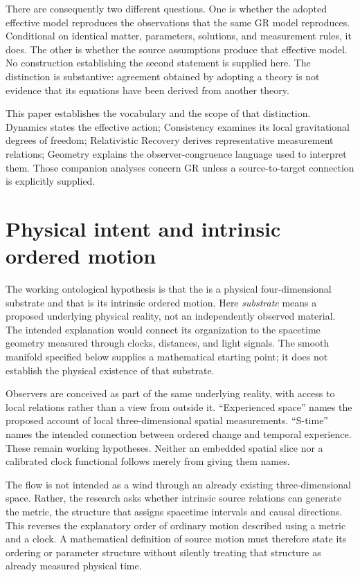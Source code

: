 \documentclass[11pt]{article}
\begin{document}
There are consequently two different questions. One is whether the adopted effective model reproduces the observations that the same GR model reproduces. Conditional on identical matter, parameters, solutions, and measurement rules, it does. The other is whether the source assumptions produce that effective model. No construction establishing the second statement is supplied here. The distinction is substantive: agreement obtained by adopting a theory is not evidence that its equations have been derived from another theory.

This paper establishes the vocabulary and the scope of that distinction. Dynamics states the effective action; Consistency examines its local gravitational degrees of freedom; Relativistic Recovery derives representative measurement relations; Geometry explains the observer-congruence language used to interpret them. Those companion analyses concern GR unless a source-to-target connection is explicitly supplied.

\section{Physical intent and intrinsic ordered motion}
The working ontological hypothesis is that the \Aether{} is a physical four-dimensional substrate and that \Aflow{} is its intrinsic ordered motion. Here \emph{substrate} means a proposed underlying physical reality, not an independently observed material. The intended explanation would connect its organization to the spacetime geometry measured through clocks, distances, and light signals. The smooth manifold specified below supplies a mathematical starting point; it does not establish the physical existence of that substrate.

Observers are conceived as part of the same underlying reality, with access to local relations rather than a view from outside it. ``Experienced space'' names the proposed account of local three-dimensional spatial measurements. ``S-time'' names the intended connection between ordered change and temporal experience. These remain working hypotheses. Neither an embedded spatial slice nor a calibrated clock functional follows merely from giving them names.

The flow is not intended as a wind through an already existing three-dimensional space. Rather, the research asks whether intrinsic source relations can generate the metric, the structure that assigns spacetime intervals and causal directions. This reverses the explanatory order of ordinary motion described using a metric and a clock. A mathematical definition of source motion must therefore state its ordering or parameter structure without silently treating that structure as already measured physical time.
\end{document}
